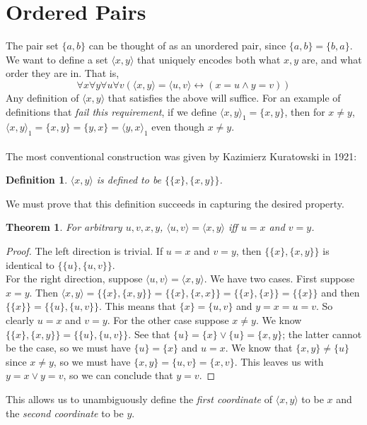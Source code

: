 \documentclass{report}
\newtheorem{theorem}[theo]{Theorem}
\newtheorem{definition}[theo]{Definition}
\begin{document}
\section{Ordered Pairs}
The pair set $\{a,b\}$ can be thought of as an unordered pair, since $\{a,b\}=\{b,a\}$. We want to define a set $\langle x,y\rangle$ that uniquely encodes both what $x,y$ are, and what order 
they are in. That is, 
\begin{equation*}
\forall x\forall y\forall u\forall v(\langle x,y\rangle=\langle u,v\rangle\leftrightarrow(x=u\land y=v))
\end{equation*}
Any definition of $\langle x,y\rangle$ that satisfies the above will suffice. For an example of definitions that \textit{fail this requirement},
if we define $\langle x,y\rangle_1=\{x,y\}$, then for $x\neq y$, $\langle x,y\rangle_1=\{x,y\}=\{y,x\}=\langle y,x\rangle_1$ even though $x\neq y$.\\
\vspace{1mm}\\
The most conventional construction was given by Kazimierz Kuratowski in 1921:
\begin{definition}
$\langle x,y\rangle$ is defined to be $\{\{x\},\{x,y\}\}$.
\end{definition}
\noindent We must prove that this definition succeeds in capturing the desired property.
\begin{theorem}
For arbitrary $u,v,x,y$, $\langle u,v\rangle=\langle x,y\rangle$ iff $u=x$ and $v=y$.
\end{theorem}
\begin{proof}
The left direction is trivial. If $u=x$ and $v=y$, then $\{\{x\},\{x,y\}\}$ is identical to $\{\{u\},\{u,v\}\}$.\\
\indent For the right direction,
suppose $\langle u,v\rangle=\langle x,y\rangle$. We have two cases. First suppose $x=y$. 
Then $\langle x,y\rangle=\{\{x\},\{x,y\}\}=\{\{x\},\{x,x\}\}=\{\{x\},\{x\}\}=\{\{x\}\}$ and then
$\{\{x\}\}=\{\{u\},\{u,v\}\}$. This means that $\{x\}=\{u,v\}$ and $y=x=u=v$. So clearly $u=x$ and $v=y$. For the other case suppose $x\neq y$. We know 
$\{\{x\},\{x,y\}\}=\{\{u\},\{u,v\}\}$. See that $\{u\}=\{x\}\lor\{u\}=\{x,y\}$; the latter cannot be the case, so we must have $\{u\}=\{x\}$ and $u=x$. We know that $\{x,y\}\neq\{u\}$ 
since $x\neq y$, so we must have $\{x,y\}=\{u,v\}=\{x,v\}$. This leaves us with $y=x\lor y=v$, so we can conclude that $y=v$.
\end{proof}
\noindent This allows us to unambiguously define the \textit{first coordinate} of $\langle x,y\rangle$ to be $x$ and the \textit{second coordinate} to be $y$.
\newpage
\end{document}
